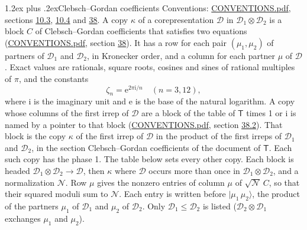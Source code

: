\documentclass[10pt,a4paper]{article}
\makeatletter
\renewcommand\section{\@startsection{section}{1}{\z@}{-3ex plus -1ex minus -.2ex}%
  {1.2ex plus .2ex}{\normalfont\large\sffamily\bfseries\color{parttitle}}}
\numberwithin{equation}{section}
\newcommand{\grp}[1]{\mathsf{#1}}
\newcommand{\iunit}{\mathrm{i}}
\newcommand{\expe}{\mathrm{e}}
\newcommand{\rootunity}[1]{\zeta_{#1}}
\newcommand{\irrprod}{\otimes}
\newcommand{\mult}{\kappa}
\newcommand{\intx}{\mu}
\newcommand{\cgnorm}{\mathcal{N}}
\newcommand{\prodket}[2]{\lvert {#1}\,{#2}\rangle}
\makeatother
\begin{document}
\section{Clebsch--Gordan coefficients}\label{s:clebsch_gordan}
Conventions: \href{../../CONVENTIONS.pdf}{CONVENTIONS.pdf}, sections \href{../../../rotation/CONVENTIONS.pdf\#conv.10.3}{10.3}, \href{../../../rotation/CONVENTIONS.pdf\#conv.10.4}{10.4} and \href{../../CONVENTIONS.pdf\#conv.38}{38}.
\leavevmode\label{n:index.copy}\label{n:matrix.cg.stored}A copy $\mult$ of a corepresentation $\mathcal{D}$ in $\mathcal{D}_1\irrprod\mathcal{D}_2$ is a block $C$ of Clebsch--Gordan coefficients that satisfies two equations (\href{../../CONVENTIONS.pdf}{CONVENTIONS.pdf}, section \href{../../CONVENTIONS.pdf\#conv.38}{38}). \label{n:index.cg}It has a row for each pair $(\intx_1, \intx_2)$ of partners of $\mathcal{D}_1$ and $\mathcal{D}_2$, in Kronecker order, and a column for each partner $\intx$ of $\mathcal{D}$.
\leavevmode\label{n:constant.root}\label{n:index.root.order}Exact values are rationals, square roots, cosines and sines of rational multiples of $\pi$, and the constants
\begin{equation}\label{e:constants}\rootunity{n} = \expe^{2\pi\iunit/n}\quad(n = 3, 12),\end{equation}
where $\iunit$ is the imaginary unit and $\expe$ is the base of the natural logarithm.
A copy whose columns of the first irrep of $\mathcal{D}$ are a block of the table of $\grp{T}$ times 1 or $\iunit$ is named by a pointer to that block (\href{../../CONVENTIONS.pdf}{CONVENTIONS.pdf}, section \href{../../CONVENTIONS.pdf\#conv.38.2}{38.2}). That block is the copy $\mult$ of the first irrep of $\mathcal{D}$ in the product of the first irreps of $\mathcal{D}_1$ and $\mathcal{D}_2$, in the section Clebsch--Gordan coefficients of the document of \href{../../../rotation/data/pdf/T.pdf}{$\grp{T}$}. Each such copy has the phase 1. The table below sets every other copy.
Each block is headed $\mathcal{D}_1\irrprod\mathcal{D}_2\to\mathcal{D}$, then $\mult$ where $\mathcal{D}$ occurs more than once in $\mathcal{D}_1\irrprod\mathcal{D}_2$, and a normalization $\cgnorm$. Row $\intx$ gives the nonzero entries of column $\intx$ of $\sqrt{\cgnorm}\,C$, so that their squared moduli sum to $\cgnorm$. \label{n:vector.ket.product}Each entry is written before $\prodket{\intx_1}{\intx_2}$, the product of the partners $\intx_1$ of $\mathcal{D}_1$ and $\intx_2$ of $\mathcal{D}_2$. Only $\mathcal{D}_1 \le \mathcal{D}_2$ is listed ($\mathcal{D}_2\irrprod\mathcal{D}_1$ exchanges $\intx_1$ and $\intx_2$).
\end{document}
